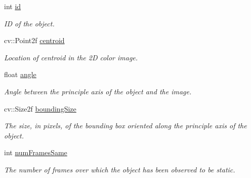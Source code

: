 \begin{DoxyCompactItemize}
\item 
\hypertarget{structpersonal_robotics_1_1_i_d_look_up_a0f1b61e41e3b5ba03a5faf230b4f6f43}{}int \hyperlink{structpersonal_robotics_1_1_i_d_look_up_a0f1b61e41e3b5ba03a5faf230b4f6f43}{id}\label{structpersonal_robotics_1_1_i_d_look_up_a0f1b61e41e3b5ba03a5faf230b4f6f43}

\begin{DoxyCompactList}\small\item\em I\+D of the object. \end{DoxyCompactList}\item 
\hypertarget{structpersonal_robotics_1_1_i_d_look_up_a323ffd9490d36efa16b877b026f2ec25}{}cv\+::\+Point2f \hyperlink{structpersonal_robotics_1_1_i_d_look_up_a323ffd9490d36efa16b877b026f2ec25}{centroid}\label{structpersonal_robotics_1_1_i_d_look_up_a323ffd9490d36efa16b877b026f2ec25}

\begin{DoxyCompactList}\small\item\em Location of centroid in the 2\+D color image. \end{DoxyCompactList}\item 
\hypertarget{structpersonal_robotics_1_1_i_d_look_up_ae0bcad20d936475857951799ce3e99c9}{}float \hyperlink{structpersonal_robotics_1_1_i_d_look_up_ae0bcad20d936475857951799ce3e99c9}{angle}\label{structpersonal_robotics_1_1_i_d_look_up_ae0bcad20d936475857951799ce3e99c9}

\begin{DoxyCompactList}\small\item\em Angle between the principle axis of the object and the image. \end{DoxyCompactList}\item 
\hypertarget{structpersonal_robotics_1_1_i_d_look_up_a6c355a58b70ec2b5b159f9e7117ef5f2}{}cv\+::\+Size2f \hyperlink{structpersonal_robotics_1_1_i_d_look_up_a6c355a58b70ec2b5b159f9e7117ef5f2}{bounding\+Size}\label{structpersonal_robotics_1_1_i_d_look_up_a6c355a58b70ec2b5b159f9e7117ef5f2}

\begin{DoxyCompactList}\small\item\em The size, in pixels, of the bounding box oriented along the principle axis of the object. \end{DoxyCompactList}\item 
\hypertarget{structpersonal_robotics_1_1_i_d_look_up_abd247349fcf800c9cda0c529c88ba63e}{}int \hyperlink{structpersonal_robotics_1_1_i_d_look_up_abd247349fcf800c9cda0c529c88ba63e}{num\+Frames\+Same}\label{structpersonal_robotics_1_1_i_d_look_up_abd247349fcf800c9cda0c529c88ba63e}

\begin{DoxyCompactList}\small\item\em The number of frames over which the object has been observed to be static. \end{DoxyCompactList}\end{DoxyCompactItemize}


